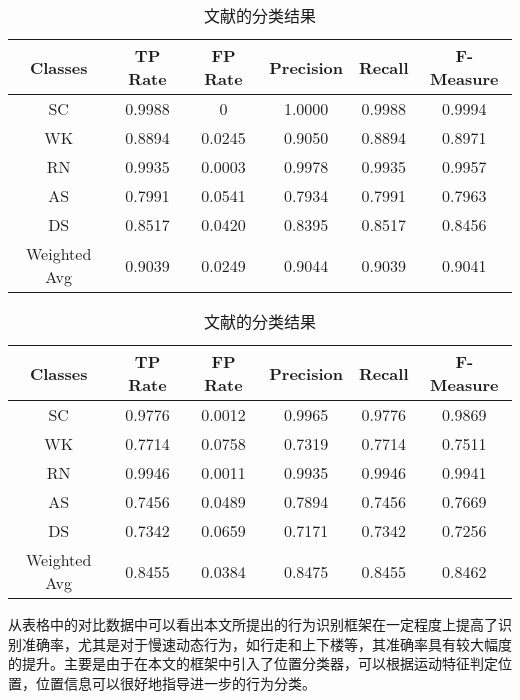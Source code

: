  \begin{table}[htb]
    \centering
    \caption{文献\cite{orientationTransation1}的分类结果}\label{com_result1}
    \begin{tabular}{cccccc}
    \toprule
    Classes & TP Rate & FP Rate & Precision & Recall & F-Measure \\
    \midrule
    SC & 0.9988 & 0 & 1.0000 & 0.9988 & 0.9994 \\
    WK & 0.8894 & 0.0245 & 0.9050 & 0.8894 & 0.8971	\\
    RN & 0.9935 & 0.0003 & 0.9978 & 0.9935 & 0.9957	\\
    AS & 0.7991 & 0.0541 & 0.7934 & 0.7991 & 0.7963 \\
    DS & 0.8517 & 0.0420 & 0.8395 & 0.8517 & 0.8456	\\
    \hline
    Weighted Avg & 0.9039 & 0.0249 & 0.9044 & 0.9039 & 0.9041 \\
    \bottomrule
    \end{tabular}
 \end{table}

  \begin{table}[htb]
    \centering
    \caption{文献\cite{bisio2014comparison}的分类结果}\label{com_result2}
    \begin{tabular}{cccccc}
    \toprule
    Classes & TP Rate & FP Rate & Precision & Recall & F-Measure \\
    \midrule
    SC & 0.9776 & 0.0012 & 0.9965 & 0.9776 & 0.9869 \\
    WK & 0.7714 & 0.0758 & 0.7319 & 0.7714 & 0.7511 \\
    RN & 0.9946 & 0.0011 & 0.9935 & 0.9946 & 0.9941 \\
    AS & 0.7456 & 0.0489 & 0.7894 & 0.7456 & 0.7669 \\
    DS & 0.7342 & 0.0659 & 0.7171 & 0.7342 & 0.7256 \\

    Weighted Avg & 0.8455 & 0.0384 & 0.8475 & 0.8455 & 0.8462 \\
    \bottomrule
    \end{tabular}
 \end{table}
\par 从表格中的对比数据中可以看出本文所提出的行为识别框架在一定程度上提高了识别准确率，尤其是对于慢速动态行为，如行走和上下楼等，其准确率具有较大幅度的提升。主要是由于在本文的框架中引入了位置分类器，可以根据运动特征判定位置，位置信息可以很好地指导进一步的行为分类。
